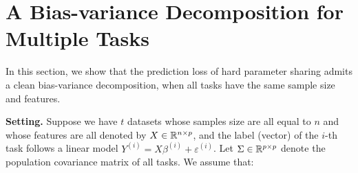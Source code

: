\section{A Bias-variance Decomposition for Multiple Tasks}\label{sec_same}

In this section, we show that the prediction loss of hard parameter sharing admits a clean bias-variance decomposition, when all tasks have the same sample size and features.

\textbf{Setting.} Suppose we have $t$ datasets whose samples size are all equal to $n$ and whose features are all denoted by $X \in \mathbb{R}^{n \times p}$, and the label (vector) of the $i$-th task follows a linear model $Y^{(i)} = X \beta^{(i)} + \varepsilon^{(i)}$.
Let $\Sigma\in \mathbb{R}^{p\times p}$ denote the population covariance matrix of all tasks.
We assume that:

